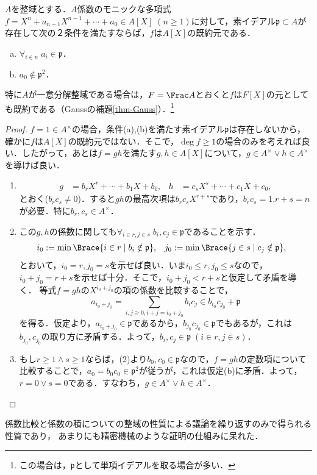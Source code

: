 \documentclass[uplatex,dvipdfmx]{jsreport}
\renewcommand{\p}{\mathfrak{p}}
\begin{document}
\begin{theorem}[Eisensteinの既約判定法]\label{thm-Eisenstein}
    $A$を整域とする．$A$係数のモニックな多項式$f=X^n+a_{n-1}X^{n-1}+\cdots+a_0\in A[X]\;(n\ge 1)$に対して，素イデアル$\p\subset A$が存在して次の２条件を満たすならば，$f$は$A[X]$の既約元である．
    \begin{enumerate}[(a)]
        \item $\forall_{i\in n}\;a_i\in\p$．
        \item $a_0\notin\p^2$．
    \end{enumerate}
    特に$A$が一意分解整域である場合は，$F=\Frac A$とおくと$f$は$F[X]$の元としても既約である（Gaussの補題\ref{thm-Gauss}）．\footnote{この場合は，$\p$として単項イデアルを取る場合が多い．}
\end{theorem}
\begin{proof}
    $f=1\in A^\times$の場合，条件(a),(b)を満たす素イデアル$\p$は存在しないから，確かに$f$は$A[X]$の既約元ではない．そこで，$\deg f\ge 1$の場合のみを考えれば良い．したがって，あとは$f=gh$を満たす$g,h\in A[X]$について，$g\in A^\times\lor h\in A^\times$を導けば良い．
    \begin{enumerate}
        \item \begin{align*}
            g&=b_rX^r+\cdots+b_1X+b_0,&h&=c_sX^s+\cdots+c_1X+c_0,
        \end{align*}
        とおく($b_rc_s\ne 0$)．すると$gh$の最高次項は$b_rc_sX^{r+s}$であり，$b_rc_s=1.r+s=n$が必要．特に$b_r,c_s\in A^\times$．
        \item この$g,h$の係数に関しても$\forall_{i\in r,j\in s}\;b_i,c_j\in\p$であることを示す．
        \begin{align*}
            i_0&:=\min\Brace{i\in r\mid b_i\notin\p},&j_0&:=\min\Brace{j\in s\mid c_j\notin\p},
        \end{align*}
        とおいて，$i_0=r,j_0=s$を示せば良い．いま$i_0\le r,j_0\le s$なので，$i_0+j_0=r+s$を示せば十分．そこで，$i_0+j_0<r+s$と仮定して矛盾を導く．
        等式$f=gh$の$X^{i_0+j_0}$の項の係数を比較することで，
        \[a_{i_0+j_0}=\sum_{i,j\ge0,i+j=i_0+j_0}b_ic_j\in b_{i_0}c_{j_0}+\p\]
        を得る．仮定より，$a_{i_0+j_0}\in\p$であるから，$b_{j_0}c_{j_0}\in\p$でもあるが，これは$b_{j_0},c_{j_0}$の取り方に矛盾する．よって，$b_i,c_j\in\p\;(i\in r,j\in s)$．
        \item もし$r\ge 1\land s\ge 1$ならば，(2)より$b_0,c_0\in\p$なので，$f=gh$の定数項について比較することで，$a_0=b_0c_0\in\p^2$が従うが，これは仮定(b)に矛盾．よって，$r=0\lor s=0$である．すなわち，$g\in A^\times\lor h\in A^\times$．
    \end{enumerate}
\end{proof}
\begin{remarks}
    係数比較と係数の積についての整域の性質による議論を繰り返すのみで得られる性質であり，
    あまりにも精密機械のような証明の仕組みに呆れた．
\end{remarks}
\end{document}
